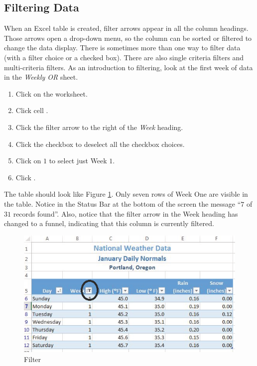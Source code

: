 \subsection{Filtering Data}

When an Excel table is created, filter arrows appear in all the column headings. Those arrows open a drop-down menu, so the column can be sorted or filtered to change the data display. There is sometimes more than one way to filter data (\ie with a filter choice or a checked box). There are also single criteria filters and multi-criteria filters. As an introduction to filtering, look at the first week of data in the \textit{Weekly OR} sheet.

\begin{enumbox}
	\begin{enumerate}
		\item Click on the  worksheet.
		\item Click cell .
		\item Click the filter arrow to the right of the \textit{Week} heading.
		\item Click the  checkbox to deselect all the checkbox choices.
		\item Click on $ 1 $ to select just Week $ 1 $.
		\item Click .
	\end{enumerate}
\end{enumbox}
	
The table should look like Figure \ref{05:fig16}. Only seven rows of Week One are visible in the table. Notice in the Status Bar at the bottom of the screen the message ``$ 7 $ of $ 31 $ records found''. Also, notice that the filter arrow in the Week heading has changed to a funnel, indicating that this column is currently filtered.

\begin{figure}[H]
	\centering
	\includegraphics[width=\maxwidth{.95\linewidth}]{gfx/ch05_fig16}
	\caption{Filter}
	\label{05:fig16}
\end{figure}


